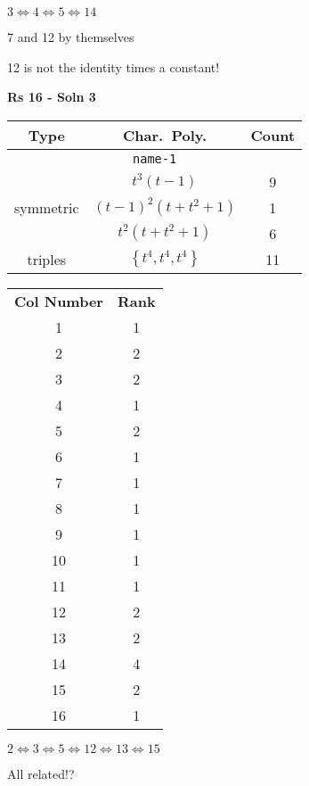 \documentclass{article}
\begin{document}
    $3 \Leftrightarrow 4 \Leftrightarrow 5 \Leftrightarrow 14$

    7 and 12 by themselves

    12 is not the identity times a constant!
    \newpage


    \textbf{Rs 16 - Soln 3}
    \begin{table}
    \begin{tabular}{|c|c|c|}
    \hline
    \textbf{Type} & \textbf{Char.~Poly.} & \textbf{Count} \\
    \hline \multicolumn{3}{|c|}{\texttt{name-1}} \\ \hline
    \multirow{3}{*}{symmetric}
    & $t^3(t - 1)$ & 9 \\
    & $(t - 1)^2(t + t^2 + 1)$ & 1 \\
    & $t^2(t + t^2 + 1)$ & 6 \\
    \hline
    \multirow{1}{*}{triples}
    & $\left\{t^4,t^4,t^4\right\}$ & 11 \\
    \hline
    \end{tabular}
    \end{table}
    \begin{table}
    \begin{tabular}{|c|c|}
    \hline
    \textbf{Col Number} & \textbf{Rank}\\
    1 & 1 \\ 
    2 & 2 \\ 
    3 & 2 \\ 
    4 & 1 \\ 
    5 & 2 \\ 
    6 & 1 \\ 
    7 & 1 \\ 
    8 & 1 \\ 
    9 & 1 \\ 
    10 & 1 \\ 
    11 & 1 \\ 
    12 & 2 \\ 
    13 & 2 \\ 
    14 & 4 \\ 
    15 & 2 \\ 
    16 & 1 \\ 
    \hline
    \end{tabular}
    \end{table}

    $2 \Leftrightarrow 3 \Leftrightarrow 5 \Leftrightarrow 12 \Leftrightarrow 13 \Leftrightarrow 15$
    
    All related!?

    \newpage
\end{document}
